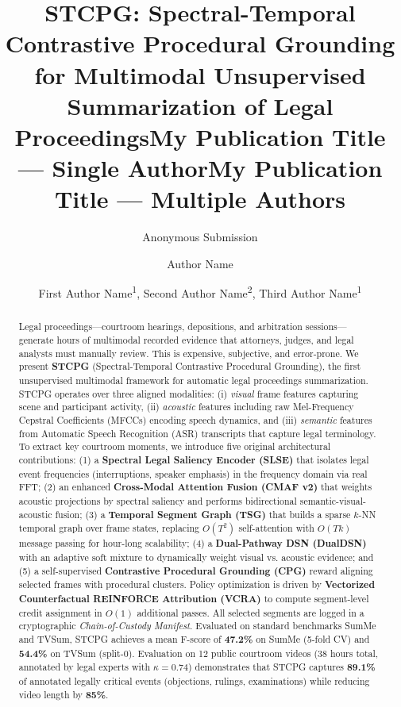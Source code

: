 \documentclass[letterpaper]{article} %
\title{STCPG: Spectral-Temporal Contrastive Procedural Grounding for Multimodal Unsupervised Summarization of Legal Proceedings}
\author {
    Anonymous Submission
}
\title{My Publication Title --- Single Author}
\author {
    Author Name
}
\title{My Publication Title --- Multiple Authors}
\author {
    First Author Name\textsuperscript{\rm 1},
    Second Author Name\textsuperscript{\rm 2},
    Third Author Name\textsuperscript{\rm 1}
}
\begin{document}
\maketitle

\begin{abstract}
Legal proceedings---courtroom hearings, depositions, and arbitration sessions---generate hours of multimodal recorded evidence that attorneys, judges, and legal analysts must manually review. This is expensive, subjective, and error-prone. We present \textbf{STCPG} (Spectral-Temporal Contrastive Procedural Grounding), the first unsupervised multimodal framework for automatic legal proceedings summarization. STCPG operates over three aligned modalities: (i) \emph{visual} frame features capturing scene and participant activity, (ii) \emph{acoustic} features including raw Mel-Frequency Cepstral Coefficients (MFCCs) encoding speech dynamics, and (iii) \emph{semantic} features from Automatic Speech Recognition (ASR) transcripts that capture legal terminology. To extract key courtroom moments, we introduce five original architectural contributions: (1) a \textbf{Spectral Legal Saliency Encoder (SLSE)} that isolates legal event frequencies (interruptions, speaker emphasis) in the frequency domain via real FFT; (2) an enhanced \textbf{Cross-Modal Attention Fusion (CMAF v2)} that weights acoustic projections by spectral saliency and performs bidirectional semantic-visual-acoustic fusion; (3) a \textbf{Temporal Segment Graph (TSG)} that builds a sparse $k$-NN temporal graph over frame states, replacing $O(T^2)$ self-attention with $O(Tk)$ message passing for hour-long scalability; (4) a \textbf{Dual-Pathway DSN (DualDSN)} with an adaptive soft mixture to dynamically weight visual vs. acoustic evidence; and (5) a self-supervised \textbf{Contrastive Procedural Grounding (CPG)} reward aligning selected frames with procedural clusters. Policy optimization is driven by \textbf{Vectorized Counterfactual REINFORCE Attribution (VCRA)} to compute segment-level credit assignment in $O(1)$ additional passes. All selected segments are logged in a cryptographic \emph{Chain-of-Custody Manifest}. Evaluated on standard benchmarks SumMe and TVSum, STCPG achieves a mean F-score of \textbf{47.2\%} on SumMe (5-fold CV) and \textbf{54.4\%} on TVSum (split-0). Evaluation on 12 public courtroom videos (38 hours total, annotated by legal experts with $\kappa=0.74$) demonstrates that STCPG captures \textbf{89.1\%} of annotated legally critical events (objections, rulings, examinations) while reducing video length by \textbf{85\%}.
\end{abstract}
\end{document}
